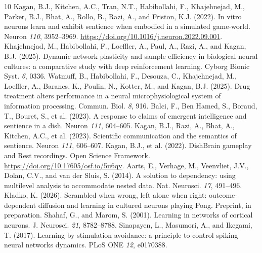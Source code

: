 \documentclass[11pt]{article}
\begin{document}
\begin{thebibliography}{10}\small
{} Kagan, B.J., Kitchen, A.C., Tran, N.T., Habibollahi, F., Khajehnejad, M., Parker, B.J., Bhat, A., Rollo, B., Razi, A., and Friston, K.J. (2022). In vitro neurons learn and exhibit sentience when embodied in a simulated game-world. Neuron \emph{110}, 3952--3969. \url{https://doi.org/10.1016/j.neuron.2022.09.001}.
 Khajehnejad, M., Habibollahi, F., Loeffler, A., Paul, A., Razi, A., and Kagan, B.J. (2025). Dynamic network plasticity and sample efficiency in biological neural cultures: a comparative study with deep reinforcement learning. Cyborg Bionic Syst. \emph{6}, 0336.
 Watmuff, B., Habibollahi, F., Desouza, C., Khajehnejad, M., Loeffler, A., Baranes, K., Poulin, N., Kotter, M., and Kagan, B.J. (2025). Drug treatment alters performance in a neural microphysiological system of information processing. Commun. Biol. \emph{8}, 916.
 Balci, F., Ben Hamed, S., Boraud, T., Bouret, S., et al. (2023). A response to claims of emergent intelligence and sentience in a dish. Neuron \emph{111}, 604--605.
 Kagan, B.J., Razi, A., Bhat, A., Kitchen, A.C., et al. (2023). Scientific communication and the semantics of sentience. Neuron \emph{111}, 606--607.
 Kagan, B.J., et al. (2022). DishBrain gameplay and Rest recordings. Open Science Framework. \url{https://doi.org/10.17605/osf.io/5u6qv}.
 Aarts, E., Verhage, M., Veenvliet, J.V., Dolan, C.V., and van der Sluis, S. (2014). A solution to dependency: using multilevel analysis to accommodate nested data. Nat. Neurosci. \emph{17}, 491--496.
 Kladko, K. (2026). Scrambled when wrong, left alone when right: outcome-dependent diffusion and learning in cultured neurons playing Pong. Preprint, in preparation.
 Shahaf, G., and Marom, S. (2001). Learning in networks of cortical neurons. J. Neurosci. \emph{21}, 8782--8788.
 Sinapayen, L., Masumori, A., and Ikegami, T. (2017). Learning by stimulation avoidance: a principle to control spiking neural networks dynamics. PLoS ONE \emph{12}, e0170388.
\end{thebibliography}
\end{document}

